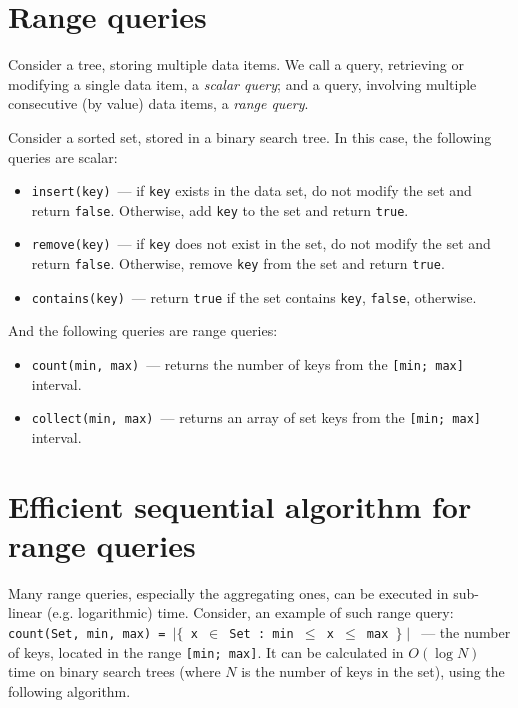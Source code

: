 \documentclass[times, dvipsnames,%
               languages={russian,english} %
              ]{itmo-student-thesis}
\begin{document}
\section{Range queries}

\begin{definition}
Consider a tree, storing multiple data items. We call a query, retrieving or modifying a single data item, a \emph{scalar query}; and a query, involving multiple consecutive (by value) data items, a \emph{range query}. 
\end{definition}
\bigbreak

Consider a sorted set, stored in a binary search tree. In this case, the following queries are scalar:

\begin{itemize}
    \item \texttt{insert(key)}~--- if \texttt{key} exists in the data set, do not modify the set and return \texttt{false}. Otherwise, add \texttt{key} to the set and return \texttt{true}.
    
    \item \texttt{remove(key)}~--- if \texttt{key} does not exist in the set, do not modify the set and return \texttt{false}. Otherwise, remove \texttt{key} from the set and return \texttt{true}.
    
    \item \texttt{contains(key)}~--- return \texttt{true} if the set contains \texttt{key}, \texttt{false}, otherwise.
\end{itemize} 

\bigbreak
And the following queries are range queries:

\begin{itemize}
    \item \texttt{count(min, max)}~--- returns the number of keys from the \texttt{[min; max]} interval.
    
    \item \texttt{collect(min, max)}~--- returns an array of set keys from the \texttt{[min; max]} interval.
\end{itemize}

\section{Efficient sequential algorithm for range queries}
\label{sequential-algorithm}

Many range queries, especially the aggregating ones, can be executed in sub-linear (e.g. logarithmic) time. Consider, an example of such range query: \newline \texttt{count(Set, min, max) = $\mid \{$ x $\in$ Set : min $\leq$ x $\leq$ max $\} \mid$}~--- the number of keys, located in the range \texttt{[min; max]}. It can be calculated in $O(\log N)$ time on binary search trees (where $N$ is the number of keys in the set), using the following algorithm.
\end{document}
